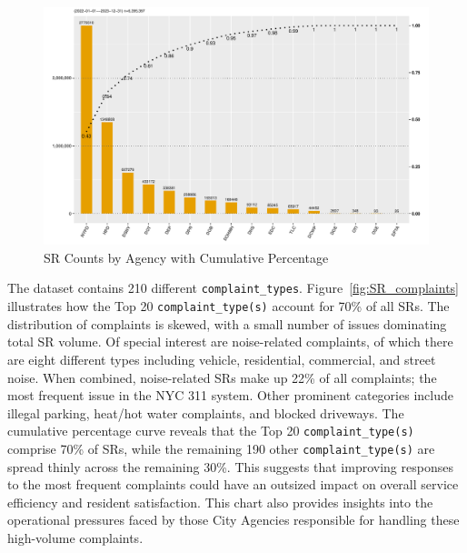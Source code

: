\documentclass[linenumber]{jdsart}
\begin{document}
\begin{figure}[tbp]
	\centering
	\includegraphics[width = \textwidth]{SRs_by_Agency.pdf}
  	\caption{SR Counts by Agency with Cumulative Percentage}
	\label{fig:SRcountbyAgency}
\end{figure}

The dataset contains 210 different \texttt{complaint\_types}. 
Figure~\ref{fig:SR_complaints} illustrates how the Top 20 
\texttt{complaint\_type(s)} account for 70\% 
of all SRs. The distribution of complaints is skewed, 
with a small number of issues dominating total SR volume. 
Of special interest are noise\mbox{-}related complaints, of 
which there are eight different types including vehicle, 
residential, commercial, and street noise. When 
combined, noise\mbox{-}related SRs make up 22\% of all 
complaints; the most frequent issue in the NYC 311 system. 
Other prominent categories include illegal parking, heat/hot water 
complaints, and blocked driveways. The cumulative percentage curve 
reveals that the Top 20 \texttt{complaint\_type(s)} comprise 70\% of SRs,
while the remaining 190 other \texttt{complaint\_type(s)}  are spread thinly 
across the remaining 30\%. This suggests that improving 
responses to the most frequent complaints could have an 
outsized impact on overall service efficiency and resident 
satisfaction. This chart also provides insights into the 
operational pressures faced by those City Agencies 
responsible for handling these high-volume complaints.
\end{document}
